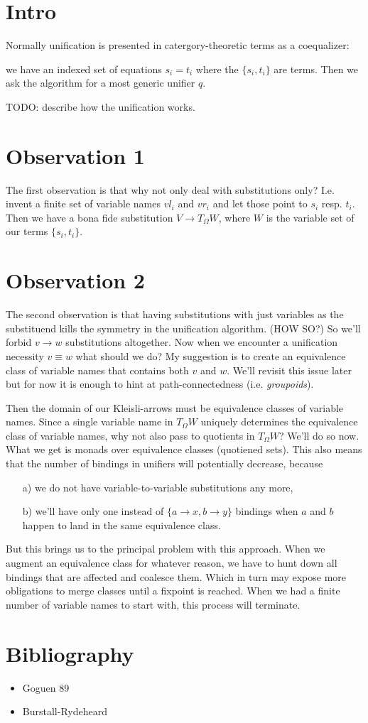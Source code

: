 \documentclass{article}
\begin{document}
\section {Intro}
Normally unification is presented in catergory-theoretic terms as a coequalizer:

we have an indexed set of equations $s_i = t_i$ where the $\{s_i, t_i\}$ are terms.
Then we ask the algorithm for a most generic unifier $q$.

TODO: describe how the unification works.

\section {Observation 1}
The first observation is that why not only deal with substitutions only? I.e. invent a finite set of variable names $vl_i$ and $vr_i$ and let those point to $s_i$ resp. $t_i$. Then we have a bona fide substitution $V \to T_{\Omega}W$, where $W$ is the variable set of our terms $\{s_i, t_i\}$.

\section {Observation 2}
The second observation is that having substitutions with just variables as the substituend kills the symmetry in the unification algorithm. (HOW SO?) So we'll forbid $v \to w$ substitutions altogether. Now when we encounter a unification necessity $v \equiv w$ what should we do?
My suggestion is to create an equivalence class of variable names that contains both $v$ and $w$. We'll revisit this issue later but for now it is enough to hint at path-connectedness (i.e. \emph{groupoids}).

Then the domain of our Kleisli-arrows must be equivalence classes of variable names. Since a single variable name in $T_{\Omega}W$ uniquely determines the equivalence class of variable names, why not also pass to quotients in $T_{\Omega}W$?
We'll do so now. What we get is monads over equivalence classes (quotiened sets). This also means that the number of bindings in unifiers will potentially decrease, because
\begin{itemize}
\item[a)] we do not have variable-to-variable substitutions any more,
\item[b)] we'll have only one instead of $\{a \to x, b \to y\}$ bindings when $a$ and $b$ happen to land in the same equivalence class.
\end{itemize}
But this brings us to the principal problem with this approach. When we augment an equivalence class for whatever reason, we have to hunt down all bindings that are affected and coalesce them. Which in turn may expose more obligations to merge classes until a fixpoint is reached. When we had a finite number of variable names to start with, this process will terminate.

\section {Bibliography}
\begin{itemize}
\item Goguen 89
\item Burstall-Rydeheard
\end{itemize}
\end{document}
